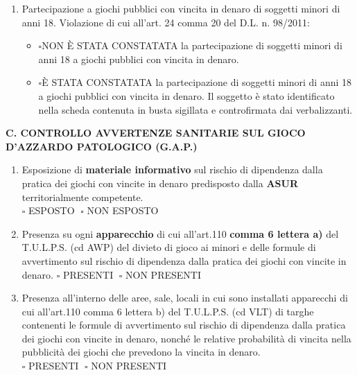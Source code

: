 \documentclass[12pt]{article}
\begin{document}
\begin{enumerate}[resume]
    \item Partecipazione a giochi pubblici con vincita in denaro di soggetti minori di anni 18. Violazione di cui all’art. 24 comma 20 del D.L. n. 98/2011:
    \begin{itemize}[label={}]
        \item \begin{math}\square\end{math}NON È STATA CONSTATATA la partecipazione di soggetti minori di anni 18 a giochi pubblici con vincita in denaro.
        \item \begin{math}\square\end{math}È STATA CONSTATATA la partecipazione di soggetti minori di anni 18 a giochi pubblici con vincita in denaro. Il soggetto è stato  identificato nella scheda contenuta in busta sigillata e controfirmata dai verbalizzanti.
    \end{itemize}
\end{enumerate}


\begin{center}
    \textbf{C. CONTROLLO AVVERTENZE SANITARIE SUL GIOCO D’AZZARDO PATOLOGICO (G.A.P.)}
\end{center}
\begin{enumerate}[resume]
    \item Esposizione di \textbf{materiale informativo} sul rischio di dipendenza dalla pratica dei giochi con vincite in denaro predisposto dalla \textbf{ASUR} territorialmente competente. \\
    \begin{math} \square\end{math} ESPOSTO \begin{math}\;\square\end{math} NON ESPOSTO
    \item Presenza su ogni \textbf{apparecchio} di cui all’art.110 \textbf{comma 6 lettera a)} del T.U.L.P.S. (cd AWP) del divieto di gioco ai minori e delle formule di avvertimento sul rischio di dipendenza dalla pratica dei giochi con vincite in denaro.
    \begin{math} \square\end{math} PRESENTI \begin{math}\;\square\end{math} NON PRESENTI

    \item Presenza all’interno delle aree, sale, locali in cui sono installati apparecchi di cui all’art.110 comma 6 lettera b) del T.U.L.P.S. (cd VLT) di targhe contenenti le formule di avvertimento sul rischio di dipendenza dalla pratica dei giochi con vincite in denaro, nonché le relative probabilità di vincita nella pubblicità dei giochi che prevedono la vincita in denaro. \\
    \begin{math} \square\end{math} PRESENTI \begin{math}\;\square\end{math} NON PRESENTI
\end{enumerate}
\end{document}
